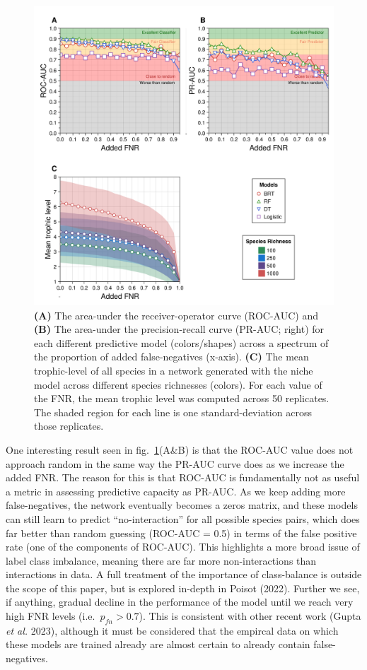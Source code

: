\documentclass[11pt]{article}
\makeatletter
\def\maxwidth{\ifdim\Gin@nat@width>\linewidth\linewidth
\else\Gin@nat@width\fi}
\let\Oldincludegraphics\includegraphics
\renewcommand{\includegraphics}[1]{\Oldincludegraphics[width=\maxwidth]{#1}}
\makeatother
\begin{document}
\begin{figure}
\hypertarget{fig:addedfnr}{%
\centering
\includegraphics{./figures/fig3.png}
\caption{\textbf{(A)} The area-under the receiver-operator curve
(ROC-AUC) and \textbf{(B)} The area-under the precision-recall curve
(PR-AUC; right) for each different predictive model (colors/shapes)
across a spectrum of the proportion of added false-negatives (x-axis).
\textbf{(C)} The mean trophic-level of all species in a network
generated with the niche model across different species richnesses
(colors). For each value of the FNR, the mean trophic level was computed
across 50 replicates. The shaded region for each line is one
standard-deviation across those replicates.}\label{fig:addedfnr}
}
\end{figure}

One interesting result seen in fig.~\ref{fig:addedfnr}(A\&B) is that the
ROC-AUC value does not approach random in the same way the PR-AUC curve
does as we increase the added FNR. The reason for this is that ROC-AUC
is fundamentally not as useful a metric in assessing predictive capacity
as PR-AUC. As we keep adding more false-negatives, the network
eventually becomes a zeros matrix, and these models can still learn to
predict ``no-interaction'' for all possible species pairs, which does
far better than random guessing (ROC-AUC = 0.5) in terms of the false
positive rate (one of the components of ROC-AUC). This highlights a more
broad issue of label class imbalance, meaning there are far more
non-interactions than interactions in data. A full treatment of the
importance of class-balance is outside the scope of this paper, but is
explored in-depth in Poisot (2022). Further we see, if anything, gradual
decline in the performance of the model until we reach very high FNR
levels (i.e.~\(p_{fn} > 0.7\)). This is consistent with other recent
work (Gupta \emph{et al.} 2023), although it must be considered that the
empircal data on which these models are trained already are almost
certain to already contain false-negatives.
\end{document}
